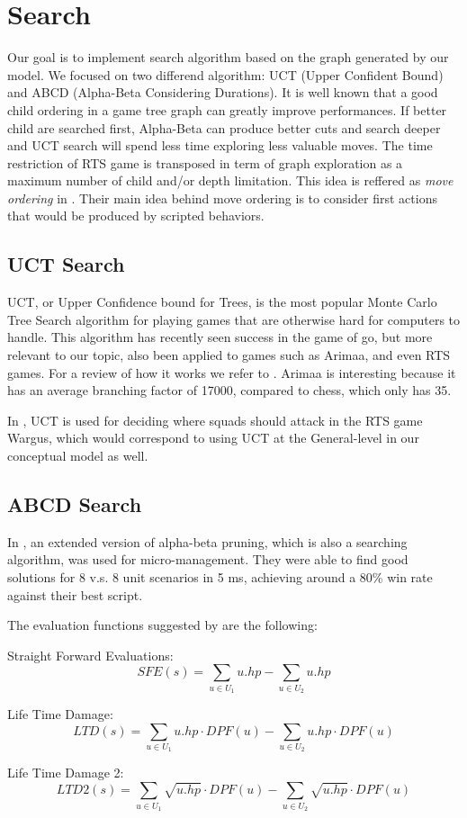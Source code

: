 \section{Search}

Our goal is to implement search algorithm based on the graph generated by our model. 
We focused on two differend algorithm: UCT (Upper Confident Bound) and ABCD (Alpha-Beta Considering Durations).  
It is well known that a good child ordering in a game tree graph can greatly improve performances.  
If better child are searched first, Alpha-Beta can produce better cuts and search deeper and UCT search will spend less time exploring less valuable moves. 
The time restriction of RTS game is transposed in term of graph exploration as a maximum number of child and/or depth limitation. 
This idea is reffered as \emph{move ordering} in \cite{portfolio}.
Their main idea behind move ordering is to consider first actions that would be produced by scripted behaviors.

\subsection{UCT Search}
UCT, or Upper Confidence bound for Trees, is the most popular Monte Carlo Tree Search algorithm for playing games that are otherwise hard for computers to handle.
This algorithm has recently seen success in the game of go, but more relevant to our topic, also been applied to games such as Arimaa, and even RTS games. For a review of how it works we refer to \cite{mcts}.
Arimaa is interesting because it has an average branching factor of 17000, compared to chess, which only has 35. \cite{arimaawiki}

In \cite{wargusuct}, UCT is used for deciding where squads should attack in the RTS game Wargus, which would correspond to using UCT at the General-level in our conceptual model as well.

\subsection{ABCD Search}
In \cite{abcd}, an extended version of alpha-beta pruning, which is also a searching algorithm, was used for micro-management. 
They were able to find good solutions for 8 v.s. 8 unit scenarios in 5 ms, achieving around a 80\% win rate against their best script.

The evaluation functions suggested by \cite{abcd} are the following:
\begin{shortitem}
\item Straight Forward Evaluations:
$$
    \displaystyle{SFE(s) = \sum_{u \in U_1} u.hp - \sum_{u \in U_2} u.hp } 
$$

\item Life Time Damage:
$$
    \displaystyle{LTD(s) = \sum_{u \in U_1} u.hp \cdot DPF(u)- \sum_{u \in U_2} u.hp \cdot DPF(u) } 
$$

\item Life Time Damage 2:
$$
    \displaystyle{LTD2(s) = \sum_{u \in U_1} \sqrt{u.hp} \cdot DPF(u) - \sum_{u \in U_2} \sqrt{u.hp} \cdot DPF(u) } 
$$
\end{shortitem}

